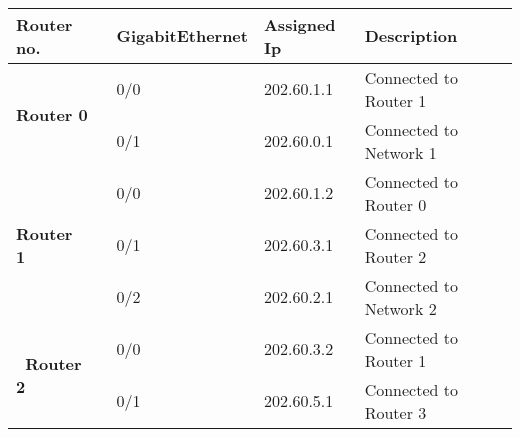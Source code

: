 \documentclass[a4paper,11pt]{article}
\begin{document}
\begin{enumerate}



          \begin{table}[H]
              \centering
              \
              \begin{tabular}{|l|l|l|l|}
                  \hline
                  \rowcolor[rgb]{0.443,0.831,1} \textbf{Router no.} & {\cellcolor[rgb]{0.325,1,0.784}}\textbf{GigabitEthernet} & \textbf{Assigned Ip} & \textbf{Description}    \\
                  \hline
                  \multirow{2}{*}{\textbf{Router 0~ }}              & {\cellcolor[rgb]{0.325,1,0.784}}0/0                      & 202.60.1.1           & Connected to Router 1~~ \\
                  \hhline{|~---|}
                                                                    & {\cellcolor[rgb]{0.325,1,0.784}}0/1                      & 202.60.0.1           & Connected to Network 1  \\
                  \hline
                  \multirow{3}{*}{\textbf{Router 1~~ }}             & {\cellcolor[rgb]{0.325,1,0.784}}0/0                      & 202.60.1.2           & Connected to Router 0   \\
                  \hhline{|~---|}
                                                                    & {\cellcolor[rgb]{0.325,1,0.784}}0/1                      & 202.60.3.1           & Connected to Router 2   \\
                  \hhline{|~---|}
                                                                    & {\cellcolor[rgb]{0.325,1,0.784}}0/2                      & 202.60.2.1           & Connected to Network 2  \\
                  \hline
                  \multirow{3}{*}{\textbf{~Router 2~~ }}            & {\cellcolor[rgb]{0.325,1,0.784}}0/0                      & 202.60.3.2           & Connected to Router 1   \\
                  \hhline{|~---|}
                                                                    & {\cellcolor[rgb]{0.325,1,0.784}}0/1                      & 202.60.5.1           & Connected to Router 3   \\

\end{tabular}
\end{table}
\end{enumerate}
\end{document}
